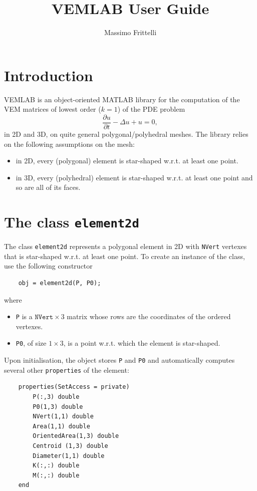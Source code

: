 \documentclass[a4paper]{article}
\begin{document}
 
\title{VEMLAB User Guide}
\author{Massimo Frittelli}

\maketitle

\section*{Introduction}
VEMLAB is an object-oriented MATLAB library for the computation of the VEM matrices of lowest order ($k=1$) of the PDE problem
\begin{equation}
\frac{\partial u}{\partial t} - \Delta u + u = 0,
\end{equation}
in 2D and 3D, on quite general polygonal/polyhedral meshes. The library relies on the following assumptions on the mesh:
\begin{itemize}
\item in 2D, every (polygonal) element is star-shaped w.r.t. at least one point.
\item in 3D, every (polyhedral) element is star-shaped w.r.t. at least one point and so are all of its faces.
\end{itemize}

\section{The class \texttt{element2d}}
The class \texttt{element2d} represents a polygonal element in 2D with \texttt{NVert} vertexes that is star-shaped w.r.t. at least one point. To create an instance of the class, use the following constructor

\begin{lstlisting}
	obj = element2d(P, P0);
\end{lstlisting}
%
where
\begin{itemize}
\item \texttt{P} is a $\texttt{NVert} \times 3$ matrix whose rows are the coordinates of the ordered vertexes. 
\item \texttt{P0}, of size $1\times 3$, is a point w.r.t. which the element is star-shaped.
\end{itemize}

\noindent
Upon initialisation, the object stores \texttt{P} and \texttt{P0} and automatically computes several other \texttt{properties} of the element:

\begin{lstlisting}
	properties(SetAccess = private)
		P(:,3) double
		P0(1,3) double 
		NVert(1,1) double
		Area(1,1) double 
		OrientedArea(1,3) double
		Centroid (1,3) double
		Diameter(1,1) double
		K(:,:) double
		M(:,:) double
	end
\end{lstlisting}
\end{document}
